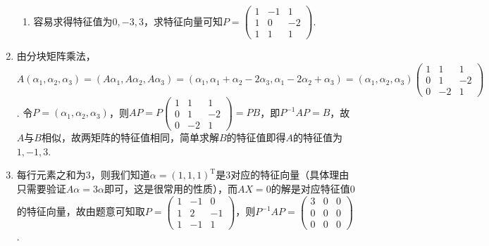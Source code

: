 \begin{enumerate}
\begin{enumerate}
              \item 容易求得特征值为$0,-3,3$，求特征向量可知$P=\begin{pmatrix}
                            1 & -1 & 1 \\ 1 & 0 & -2 \\ 1 & 1 & 1
                        \end{pmatrix}$.
          \end{enumerate}

    \item 由分块矩阵乘法，$A(\alpha_1,\alpha_2,\alpha_3)=(A\alpha_1,A\alpha_2,A\alpha_3)=(\alpha_1,\alpha_1+\alpha_2-2\alpha_3,\alpha_1-2\alpha_2+\alpha_3)=(\alpha_1,\alpha_2,\alpha_3)\begin{pmatrix}
                  1 & 1 & 1 \\ 0 & 1 & -2 \\ 0 & -2 & 1
              \end{pmatrix}$. 令$P=(\alpha_1,\alpha_2,\alpha_3)$，则$AP=P\begin{pmatrix}
                  1 & 1 & 1 \\ 0 & 1 & -2 \\ 0 & -2 & 1
              \end{pmatrix}=PB$，即$P^{-1}AP=B$，故$A$与$B$相似，故两矩阵的特征值相同，简单求解$B$的特征值即得$A$的特征值为$1,-1,3$.

    \item 每行元素之和为3，则我们知道$\alpha=(1,1,1)^\mathrm{T}$是3对应的特征向量（具体理由只需要验证$A\alpha=3\alpha$即可，这是很常用的性质），而$AX=0$的解是对应特征值0的特征向量，故由题意可知取$P=\begin{pmatrix}
                  1 & -1 & 0 \\ 1 & 2 & -1 \\ 1 & -1 & 1
              \end{pmatrix}$，则$P^{-1}AP=\begin{pmatrix}
                  3 & 0 & 0 \\ 0 & 0 & 0 \\ 0 & 0 & 0
              \end{pmatrix}$.
\end{enumerate}


